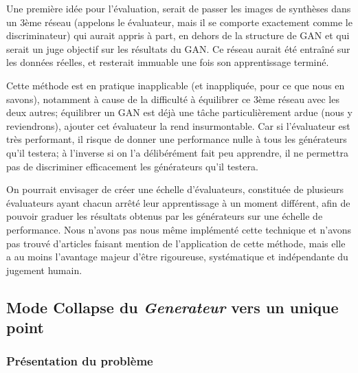 Une première idée pour l'évaluation, serait de passer les images de synthèses dans un 3ème réseau (appelons le évaluateur, mais il se comporte exactement comme le discriminateur) qui aurait appris à part, en dehors de la structure de GAN et qui serait un juge objectif sur les résultats du GAN. Ce réseau aurait été entraîné sur les données réelles, et resterait immuable une fois son apprentissage terminé. 

Cette méthode est en pratique inapplicable (et inappliquée, pour ce que nous en savons), notamment à cause de la difficulté à équilibrer ce 3ème réseau avec les deux autres; équilibrer un GAN est déjà une tâche particulièrement ardue (nous y reviendrons), ajouter cet évaluateur la rend insurmontable. Car si l'évaluateur est très performant, il risque de donner une performance nulle à tous les générateurs qu'il testera; à l'inverse si on l'a délibérément fait peu apprendre, il ne permettra pas de discriminer efficacement les générateurs qu'il testera.

On pourrait envisager de créer une échelle d'évaluateurs, constituée de plusieurs évaluateurs ayant chacun arrêté leur apprentissage à un moment différent, afin de pouvoir graduer les résultats obtenus par les générateurs sur une échelle de performance. Nous n'avons pas nous même implémenté cette technique et n'avons pas trouvé d'articles faisant mention de l'application de cette méthode, mais elle a au moins l'avantage majeur d'être rigoureuse, systématique et indépendante du jugement humain.

\subsection{Mode Collapse du \textit{Generateur} vers un unique point}
\subsubsection{Présentation du problème}

